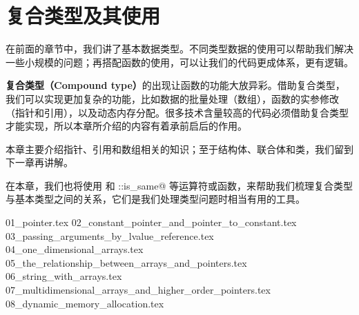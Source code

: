 \chapter{复合类型及其使用}
在前面的章节中，我们讲了基本数据类型。不同类型数据的使用可以帮助我们解决一些小规模的问题；再搭配函数的使用，可以让我们的代码更成体系，更有逻辑。\par
\textbf{复合类型（Compound type）}的出现让函数的功能大放异彩。借助复合类型，我们可以实现更加复杂的功能，比如数据的批量处理（数组），函数的实参修改（指针和引用），以及动态内存分配。很多技术含量较高的代码必须借助复合类型才能实现，所以本章所介绍的内容有着承前启后的作用。\par
本章主要介绍指针、引用和数组相关的知识；至于结构体、联合体和类，我们留到下一章再讲解。\par
在本章，我们也将使用 \lstinline@typeid@ 和 \lstinline@std::is_same@ 等运算符或函数，来帮助我们梳理复合类型与基本类型之间的关系，它们是我们处理类型问题时相当有用的工具。\par
{01_pointer.tex}
{02_constant_pointer_and_pointer_to_constant.tex}
{03_passing_arguments_by_lvalue_reference.tex}
{04_one_dimensional_arrays.tex}
{05_the_relationship_between_arrays_and_pointers.tex}
{06_string_with_arrays.tex}
{07_multidimensional_arrays_and_higher_order_pointers.tex}
{08_dynamic_memory_allocation.tex}